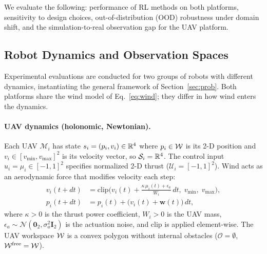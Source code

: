 \documentclass{article}
\providecommand{\obst}{\mathcal{O}}
\providecommand{\free}{\mathrm{free}}
\begin{document}
We evaluate the following: performance of RL methods on both platforms, sensitivity to design choices, out-of-distribution (OOD) robustness under domain shift, and the simulation-to-real observation gap for the UAV platform.

\subsection{Robot Dynamics and Observation Spaces}
\label{sec:exp:dynamics}

Experimental evaluations are conducted for two groups of robots with different dynamics, instantiating the general framework of Section~\ref{sec:prob}. Both platforms share the wind model of Eq.~\eqref{eq:wind}; they differ in how wind enters the dynamics.

\paragraph{UAV dynamics (holonomic, Newtonian).}
Each UAV $\mathcal{M}_i$ has state $s_i = (p_i, v_i) \in \mathbb{R}^4$ where $p_i \in \mathcal{W}$ is its 2-D position and $v_i \in [v_{\min}, v_{\max}]^2$ is its velocity vector, so $\mathcal{S}_i = \mathbb{R}^4$. The control input $u_i = \mu_i \in [-1,1]^2$ specifies normalized 2-D thrust ($\mathcal{U}_i = [-1,1]^2$). Wind acts as an aerodynamic force that modifies velocity each step:
\begin{align}
    v_i(t+dt) &= \text{clip}\!\Big( v_i(t) + \tfrac{\kappa\,\mu_i(t) + \epsilon_a}{W_i}\,dt,\; v_{\min},\; v_{\max}\Big), \label{eq:uav_vel} \\
    p_i(t+dt) &= p_i(t) + \big(v_i(t) + \mathbf{w}(t)\big)\,dt, \label{eq:uav_pos}
\end{align}
where $\kappa > 0$ is the thrust power coefficient, $W_i > 0$ is the UAV mass, $\epsilon_a \sim \mathcal{N}(\mathbf{0}_2, \sigma_a^2 \mathbf{I}_2)$ is the actuation noise, and $\text{clip}$ is applied element-wise. The UAV workspace $\mathcal{W}$ is a convex polygon without internal obstacles ($\obst = \emptyset$, $\wspace^{\free} = \wspace$).
\end{document}

